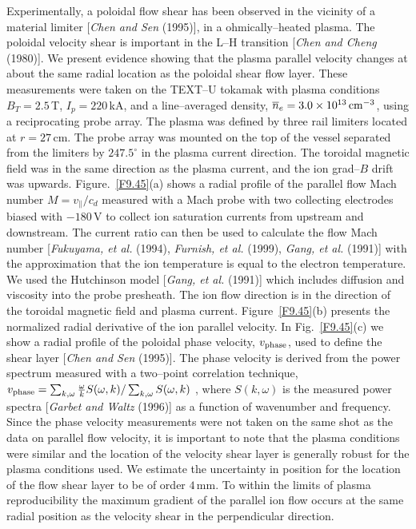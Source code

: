\documentclass[a4paper,openany,12pt]{book}
\begin{document}
{Experimentally, a poloidal flow shear has been observed in the vicinity of a material limiter [\emph{Chen and Sen} (1995)], in a ohmically--heated plasma. The poloidal velocity shear is important in the L--H transition [\emph{Chen and Cheng} (1980)]. We present evidence showing that the plasma parallel velocity changes at about the same radial location as the poloidal shear flow layer. These measurements were taken on the TEXT--U tokamak with plasma conditions 
$B_T=2.5\,$T, $I_p=220\,$kA, and a line--averaged density, $\overline n_e=3.0\times 10^{13}\,\rm cm^{-3}$, using a reciprocating probe array. The plasma was defined by three rail limiters located at $r=27\,$cm. The probe array was mounted on the top of the vessel separated from the limiters by $247.5^\circ$ in the plasma current direction. The toroidal magnetic field was in the same direction as the plasma current, and the ion grad--$B$ drift was upwards. Figure.~\ref{F9.45}(a) shows a radial profile of the parallel flow Mach number $M=v_\|/c_d$ measured with a Mach probe with two collecting electrodes biased with $-180\,$V to collect ion saturation currents from upstream and downstream. The current ratio can then be used to calculate the flow Mach number [\emph{Fukuyama, et al.} (1994), \emph{Furnish, et al.} (1999), \emph{Gang, et al.} (1991)] with the approximation that the ion temperature is equal to the electron temperature. We used the Hutchinson model [\emph{Gang, et al.} (1991)] which includes diffusion and viscosity into the probe presheath. The ion flow direction is in the direction of the toroidal magnetic field and plasma current. Figure~\ref{F9.45}(b) presents the normalized radial derivative of the ion parallel velocity. In Fig.~\ref{F9.45}(c) we show a radial profile of the poloidal phase velocity, $v_{\rm phase}$, used to define the shear layer [\emph{Chen and Sen} (1995)]. The phase velocity is derived from the power spectrum measured with a two--point correlation technique, $v_{\rm phase}=\sum_{k,\omega}\frac{\omega}{k}S(\omega, k)/\sum_{k,\omega}S(\omega, k)$ , where $S(k, \omega)$ is the measured power spectra [\emph{Garbet and Waltz} (1996)] as a function of wavenumber and frequency. Since the phase velocity measurements were not taken on the same shot as the data on parallel flow velocity, it is important to note that the plasma conditions were similar and the location of the velocity shear layer is generally robust for the plasma conditions used. We estimate the uncertainty in position for the location of the flow shear layer to be of order $4\,$mm. To within the limits of plasma reproducibility the maximum gradient of the parallel ion flow occurs at the same radial position as the velocity shear in the perpendicular direction.

}
\end{document}
